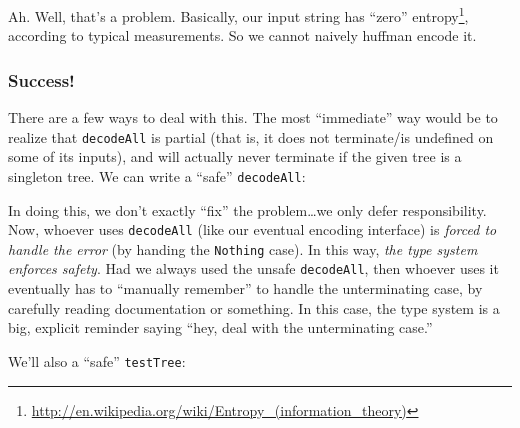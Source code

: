 \documentclass[]{article}
\newenvironment{Shaded}{}{}
\newcommand{\CommentTok}[1]{\textcolor[rgb]{0.38,0.63,0.69}{\textit{#1}}}
\newcommand{\DataTypeTok}[1]{\textcolor[rgb]{0.56,0.13,0.00}{#1}}
\newcommand{\NormalTok}[1]{#1}
\newcommand{\OperatorTok}[1]{\textcolor[rgb]{0.40,0.40,0.40}{#1}}
\newcommand{\OtherTok}[1]{\textcolor[rgb]{0.00,0.44,0.13}{#1}}
\renewcommand{\href}[2]{#2\footnote{\url{#1}}}
\begin{document}
Ah. Well, that's a problem. Basically, our input string has
\href{http://en.wikipedia.org/wiki/Entropy_(information_theory)}{``zero''
entropy}, according to typical measurements. So we cannot naively huffman encode
it.

\subsubsection{Success!}\label{success}

There are a few ways to deal with this. The most ``immediate'' way would be to
realize that \texttt{decodeAll} is partial (that is, it does not terminate/is
undefined on some of its inputs), and will actually never terminate if the given
tree is a singleton tree. We can write a ``safe'' \texttt{decodeAll}:

\begin{Shaded}
\end{Shaded}

In doing this, we don't exactly ``fix'' the problem\ldots we only defer
responsibility. Now, whoever uses \texttt{decodeAll\textquotesingle{}} (like our
eventual encoding interface) is \emph{forced to handle the error} (by handing
the \texttt{Nothing} case). In this way, \emph{the type system enforces safety}.
Had we always used the unsafe \texttt{decodeAll}, then whoever uses it
eventually has to ``manually remember'' to handle the unterminating case, by
carefully reading documentation or something. In this case, the type system is a
big, explicit reminder saying ``hey, deal with the unterminating case.''

We'll also a ``safe'' \texttt{testTree}:
\end{document}
